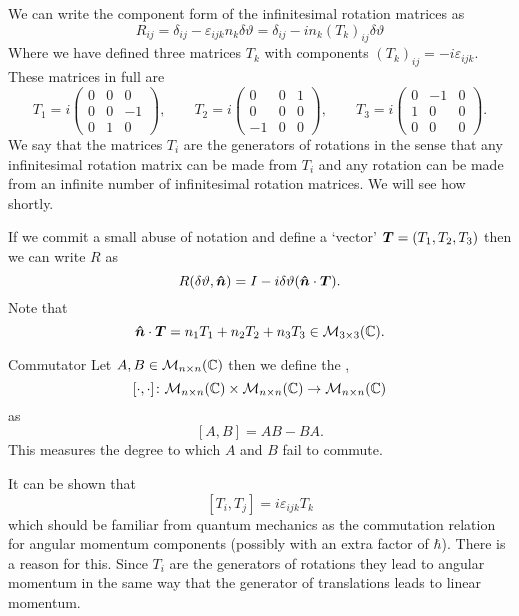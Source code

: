 \documentclass[a4paper]{article}
\newcommand{\nxmMatrices}[3]{\mathcal{M}_{{#1}\times{#2}}({#3})}
\renewcommand{\ident}{I}
\begin{document}
    We can write the component form of the infinitesimal rotation matrices as
    \[R_{ij} = \delta_{ij} - \varepsilon_{ijk}n_k\delta\vartheta = \delta_{ij} - in_k(T_k)_{ij}\delta\vartheta\]
    Where we have defined three matrices \(T_k\) with components \((T_k)_{ij} = -i\varepsilon_{ijk}\).
    These matrices in full are
    \[
        T_1 = i
        \begin{pmatrix}
            0 & 0 & 0\\
            0 & 0 & -1\\
            0 & 1 & 0
        \end{pmatrix}
        , \qquad T_2 = i
        \begin{pmatrix}
            0 & 0 & 1\\
            0 & 0 & 0\\
            -1 & 0 & 0
        \end{pmatrix}
        , \qquad T_3 = i
        \begin{pmatrix}
            0 & -1 & 0\\
            1 & 0 & 0\\
            0 & 0 & 0
        \end{pmatrix}
        .
    \]
    We say that the matrices \(T_i\) are the generators of rotations in the sense that any infinitesimal rotation matrix can be made from \(T_i\) and any rotation can be made from an infinite number of infinitesimal rotation matrices.
    We will see how shortly.
    
    If we commit a small abuse of notation and define a `vector' \(\bm{T} = (T_1, T_2, T_3)\) then we can write \(R\) as
    \[R(\delta\vartheta, \vh{n}) = \ident - i\delta\vartheta (\vh{n}\cdot\vv{T}).\]
    Note that
    \[\vh{n}\cdot\vv{T} = n_1T_1 + n_2T_2 + n_3T_3 \in\nxmMatrices{3}{3}{\complex}.\]
    
    \begin{definition}{Commutator}{}
        Let \(A, B\in\nxmMatrices{n}{n}{\complex}\) then we define the , 
        \[[\cdot, \cdot]\colon \nxmMatrices{n}{n}{\complex}\times \nxmMatrices{n}{n}{\complex} \to \nxmMatrices{n}{n}{\complex}\]
        as
        \[[A, B] = AB - BA.\]
        This measures the degree to which \(A\) and \(B\) fail to commute.
    \end{definition}
    It can be shown that
    \[[T_i, T_j] = i\varepsilon_{ijk}T_k\]
    which should be familiar from quantum mechanics as the commutation relation for angular momentum components (possibly with an extra factor of \(\hbar\)).
    There is a reason for this.
    Since \(T_i\) are the generators of rotations they lead to angular momentum in the same way that the generator of translations leads to linear momentum.
    
\end{document}
